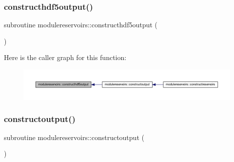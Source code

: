 \subsubsection{\texorpdfstring{constructhdf5output()}{constructhdf5output()}}
{\footnotesize\ttfamily subroutine modulereservoirs\+::constructhdf5output (\begin{DoxyParamCaption}{ }\end{DoxyParamCaption})\hspace{0.3cm}{\ttfamily [private]}}

Here is the caller graph for this function\+:\nopagebreak
\begin{figure}[H]
\begin{center}
\leavevmode
\includegraphics[width=350pt]{namespacemodulereservoirs_aa1585e14b10abec0e0a86d6b4674be9c_icgraph}
\end{center}
\end{figure}
\mbox{\label{namespacemodulereservoirs_a43db2f4830b1c886cf024e34a2682edb}} 
\subsubsection{\texorpdfstring{constructoutput()}{constructoutput()}}
{\footnotesize\ttfamily subroutine modulereservoirs\+::constructoutput (\begin{DoxyParamCaption}{ }\end{DoxyParamCaption})\hspace{0.3cm}{\ttfamily [private]}}

